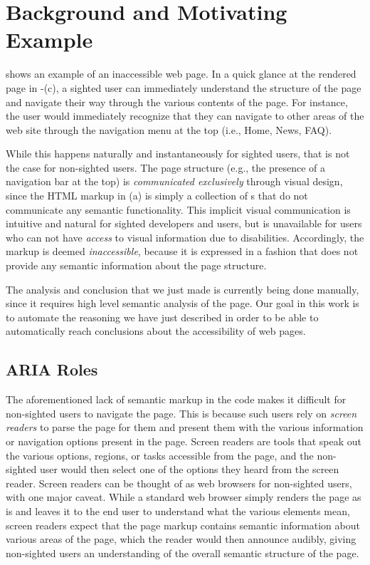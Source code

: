 
\section{Background and Motivating Example}
 shows an example of
an inaccessible web page. 
In a quick glance at the rendered page in -(c),
a sighted user can immediately understand
the structure of the page and navigate their way through
the various contents of the page.
For instance, the user would immediately recognize 
that they can navigate to other areas of the web site 
through the navigation menu at the top 
(i.e., Home, News, FAQ). 

While this happens naturally and instantaneously for sighted users, 
that is not the case for non-sighted users. 
The page structure (e.g., the presence of a navigation bar at the top)
is \emph{communicated exclusively} through visual design, 
since the HTML markup in (a) 
is simply a collection of s that do not communicate  
any semantic functionality. 
This implicit visual communication is intuitive and natural 
for sighted developers and users, but is unavailable 
for users who can not have \emph{access} to visual 
information due to disabilities. 
Accordingly, the markup is deemed \emph{inaccessible}, 
because it is expressed in a fashion that does not provide 
any semantic information about the page structure.  



The analysis and conclusion that we just made is currently 
being done manually, since it requires high level semantic analysis of the page. 
Our goal in this work is to automate the reasoning we have 
just described in order to be able to automatically 
reach conclusions about the accessibility of web pages. 


\subsection{ARIA  Roles}\label{subsec:aria-roles}
The aforementioned lack of semantic markup in the 
code makes it difficult for non-sighted 
users to navigate the page. This is because such users rely on 
\emph{screen readers} to parse the page for them 
and present them with the various information or navigation options present in the page. 
Screen readers are tools that speak out the various options, regions, or tasks accessible 
from the page, and the non-sighted user would then select one of the options they heard from 
the screen reader. 
Screen readers can be thought of as web browsers for non-sighted users, 
with one major caveat.
While a standard web browser simply renders the page as is and leaves 
it to the end user to understand what the various elements mean, 
screen readers expect that the page markup contains semantic information 
about various areas of the page, which the reader would then announce audibly, 
giving non-sighted users an understanding of the overall semantic structure of the page.


